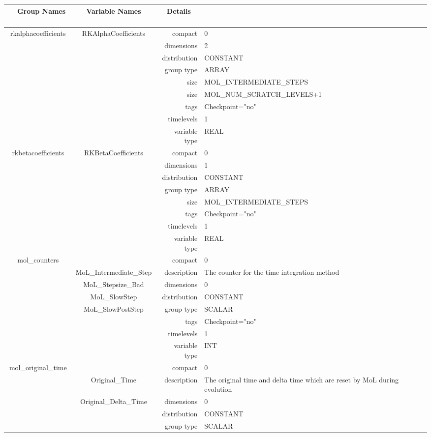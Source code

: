 \begin{tabular*}{150mm}{|c|c@{\extracolsep{\fill}}|rl|} \hline 
~ {\bf Group Names} ~ & ~ {\bf Variable Names} ~  &{\bf Details} ~ & ~\\ 
\hline 
rkalphacoefficients & RKAlphaCoefficients & compact & 0 \\ 
 &  & dimensions & 2 \\ 
 &  & distribution & CONSTANT \\ 
 &  & group type & ARRAY \\ 
 &  & size & MOL\_INTERMEDIATE\_STEPS \\ 
& ~ & size & MOL\_NUM\_SCRATCH\_LEVELS+1 \\ 
 &  & tags & Checkpoint="no" \\ 
 &  & timelevels & 1 \\ 
 &  & variable type & REAL \\ 
\hline 
rkbetacoefficients & RKBetaCoefficients & compact & 0 \\ 
 &  & dimensions & 1 \\ 
 &  & distribution & CONSTANT \\ 
 &  & group type & ARRAY \\ 
 &  & size & MOL\_INTERMEDIATE\_STEPS \\ 
 &  & tags & Checkpoint="no" \\ 
 &  & timelevels & 1 \\ 
 &  & variable type & REAL \\ 
\hline 
mol\_counters &  & compact & 0 \\ 
 & MoL\_Intermediate\_Step & description & The counter for the time integration method \\ 
 & MoL\_Stepsize\_Bad & dimensions & 0 \\ 
 & MoL\_SlowStep & distribution & CONSTANT \\ 
 & MoL\_SlowPostStep & group type & SCALAR \\ 
 &  & tags & Checkpoint="no" \\ 
 &  & timelevels & 1 \\ 
 &  & variable type & INT \\ 
\hline 
mol\_original\_time &  & compact & 0 \\ 
 & Original\_Time & description & The original time and delta time which are reset by MoL during evolution \\ 
 & Original\_Delta\_Time & dimensions & 0 \\ 
 &  & distribution & CONSTANT \\ 
 &  & group type & SCALAR \\ 

\end{tabular*}
